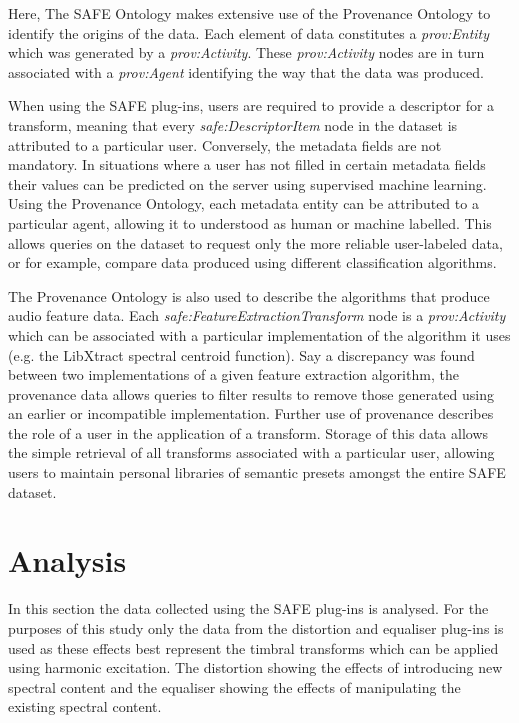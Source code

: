 		Here, The SAFE Ontology makes extensive use of the Provenance Ontology to identify the origins of the data.
		Each element of data constitutes a \emph{prov:Entity} which was generated by a \emph{prov:Activity}. These
		\emph{prov:Activity} nodes are in turn associated with a \emph{prov:Agent} identifying the way that the
		data was produced.

		When using the SAFE plug-ins, users are required to provide a descriptor for a transform, meaning that
		every \emph{safe:DescriptorItem} node in the dataset is attributed to a particular user. Conversely, the
		metadata fields are not mandatory. In situations where a user has not filled in certain metadata fields
		their values can be predicted on the server using supervised machine learning. Using the Provenance
		Ontology, each metadata entity can be attributed to a particular agent, allowing it to understood as human
		or machine labelled. This allows queries on the dataset to request only the more reliable user-labeled
		data, or for example, compare data produced using different classification algorithms.

		The Provenance Ontology is also used to describe the algorithms that produce audio feature data. Each
		\emph{safe:FeatureExtractionTransform} node is a \emph{prov:Activity} which can be associated with a
		particular implementation of the algorithm it uses (e.g. the LibXtract \citep{bullock2007libxtract}
		spectral centroid function). Say a discrepancy was found between two implementations of a given feature
		extraction algorithm, the provenance data allows queries to filter results to remove those generated using
		an earlier or incompatible implementation. Further use of provenance describes the role of a user in the
		application of a transform. Storage of this data allows the simple retrieval of all transforms associated
		with a particular user, allowing users to maintain personal libraries of semantic presets amongst the
		entire SAFE dataset.

\section{Analysis}
\label{sec:TimbreEvaluation-Analysis}
	In this section the data collected using the SAFE plug-ins is analysed. For the purposes of this study only the
	data from the distortion and equaliser plug-ins is used as these effects best represent the timbral transforms
	which can be applied using harmonic excitation. The distortion showing the effects of introducing new spectral
	content and the equaliser showing the effects of manipulating the existing spectral content.

